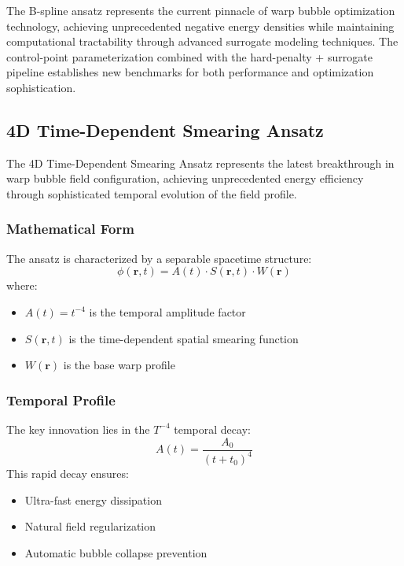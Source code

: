 \documentclass[12pt]{article}
\begin{document}
The B-spline ansatz represents the current pinnacle of warp bubble optimization technology, achieving unprecedented negative energy densities while maintaining computational tractability through advanced surrogate modeling techniques. The control-point parameterization combined with the hard-penalty + surrogate pipeline establishes new benchmarks for both performance and optimization sophistication.

\subsection{4D Time-Dependent Smearing Ansatz}
\label{sec:time_dependent_smearing}

The 4D Time-Dependent Smearing Ansatz represents the latest breakthrough in warp bubble field configuration, achieving unprecedented energy efficiency through sophisticated temporal evolution of the field profile.

\subsubsection{Mathematical Form}
The ansatz is characterized by a separable spacetime structure:
\begin{equation}
    \phi(\mathbf{r}, t) = A(t) \cdot S(\mathbf{r}, t) \cdot W(\mathbf{r})
\end{equation}
where:
\begin{itemize}
    \item $A(t) = t^{-4}$ is the temporal amplitude factor
    \item $S(\mathbf{r}, t)$ is the time-dependent spatial smearing function
    \item $W(\mathbf{r})$ is the base warp profile
\end{itemize}

\subsubsection{Temporal Profile}
The key innovation lies in the $T^{-4}$ temporal decay:
\begin{equation}
    A(t) = \frac{A_0}{(t + t_0)^4}
\end{equation}
This rapid decay ensures:
\begin{itemize}
    \item Ultra-fast energy dissipation
    \item Natural field regularization
    \item Automatic bubble collapse prevention
\end{itemize}
\end{document}
